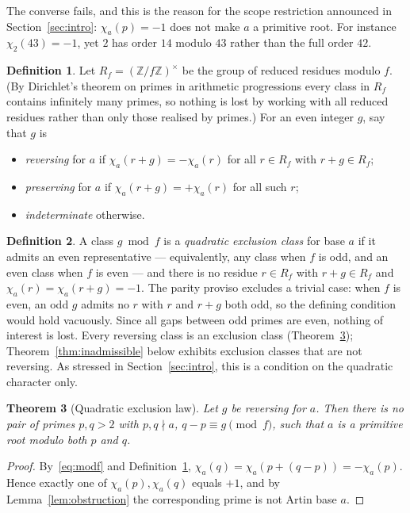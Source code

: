 \documentclass[11pt,reqno]{amsart}
\theoremstyle{plain}
\newtheorem{theorem}{Theorem}
\theoremstyle{definition}
\newtheorem{definition}[theorem]{Definition}
\newcommand{\Z}{\mathbb{Z}}
\begin{document}
The converse fails, and this is the reason for the scope restriction announced
in Section~\ref{sec:intro}: $\chi_a(p) = -1$ does not make $a$ a primitive
root. For instance $\chi_2(43) = -1$, yet $2$ has order $14$ modulo $43$ rather
than the full order $42$.

\begin{definition}
\label{def:shift}
Let $R_f = (\Z/f\Z)^\times$ be the group of reduced residues modulo $f$. (By
Dirichlet's theorem on primes in arithmetic progressions every class in $R_f$
contains infinitely many primes, so nothing is lost by working with all reduced
residues rather than only those realised by primes.) For an even integer $g$,
say that $g$ is
\begin{itemize}
\item \emph{reversing} for $a$ if $\chi_a(r+g) = -\chi_a(r)$ for all $r \in R_f$
      with $r + g \in R_f$;
\item \emph{preserving} for $a$ if $\chi_a(r+g) = +\chi_a(r)$ for all such $r$;
\item \emph{indeterminate} otherwise.
\end{itemize}
\end{definition}

\begin{definition}
\label{def:exclusion}
A class $g \bmod f$ is a \emph{quadratic exclusion class} for base $a$ if it
admits an even representative --- equivalently, any class when $f$ is odd, and
an even class when $f$ is even --- and there is no residue $r \in R_f$ with
$r + g \in R_f$ and $\chi_a(r) = \chi_a(r+g) = -1$. The parity proviso
excludes a trivial case: when $f$ is even, an odd $g$ admits no $r$ with $r$
and $r+g$ both odd, so the defining condition would hold vacuously. Since all
gaps between odd primes are even, nothing of interest is lost. Every reversing class is an exclusion class
(Theorem~\ref{thm:exclusion}); Theorem~\ref{thm:inadmissible} below exhibits
exclusion classes that are not reversing. As stressed in
Section~\ref{sec:intro}, this is a condition on the quadratic character only.
\end{definition}

\begin{theorem}[Quadratic exclusion law]
\label{thm:exclusion}
Let $g$ be reversing for $a$. Then there is no pair of primes $p, q > 2$ with
$p, q \nmid a$, $q - p \equiv g \pmod f$, such that $a$ is a primitive root
modulo both $p$ and $q$.
\end{theorem}

\begin{proof}
By~\eqref{eq:modf} and Definition~\ref{def:shift},
$\chi_a(q) = \chi_a(p + (q-p)) = -\chi_a(p)$. Hence exactly one of
$\chi_a(p), \chi_a(q)$ equals $+1$, and by Lemma~\ref{lem:obstruction} the
corresponding prime is not Artin base $a$.
\end{proof}
\end{document}
